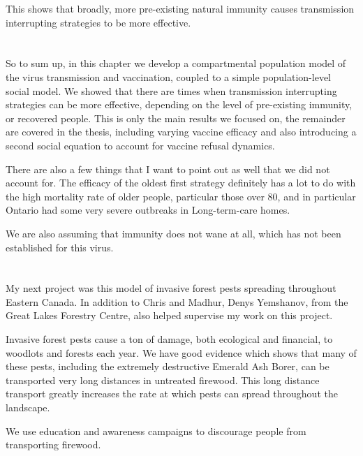\documentclass{article}
\begin{document}
This shows that broadly, more pre-existing natural immunity causes transmission interrupting strategies to be more effective.

\section{}

So to sum up, in this chapter we develop a compartmental population model of the virus transmission and vaccination, coupled to a simple population-level social model. We showed that there are times when transmission interrupting strategies can be more effective, depending on the level of pre-existing immunity, or recovered people. This is only the main results we focused on, the remainder are covered in the thesis, including varying vaccine efficacy and also introducing a second social equation to account for vaccine refusal dynamics.

There are also a few things that I want to point out as well that we did not account for. The efficacy of the oldest first strategy definitely has a lot to do with the high mortality rate of older people, particular those over 80, and in particular Ontario had some very severe outbreaks in Long-term-care homes.

We are also assuming that immunity does not wane at all, which has not been established for this virus.

\section{}

My next project was this model of invasive forest pests spreading throughout Eastern Canada. In addition to Chris and Madhur, Denys Yemshanov, from the Great Lakes Forestry Centre, also helped supervise my work on this project. 

Invasive forest pests cause a ton of damage, both ecological and financial, to woodlots and forests each year. We have good evidence which shows that many of these pests, including the extremely destructive Emerald Ash Borer, can be transported very long distances in untreated firewood. This long distance transport greatly increases the rate at which pests can spread throughout the landscape.

We use education and awareness campaigns to discourage people from transporting firewood. 


\section{}
\end{document}
